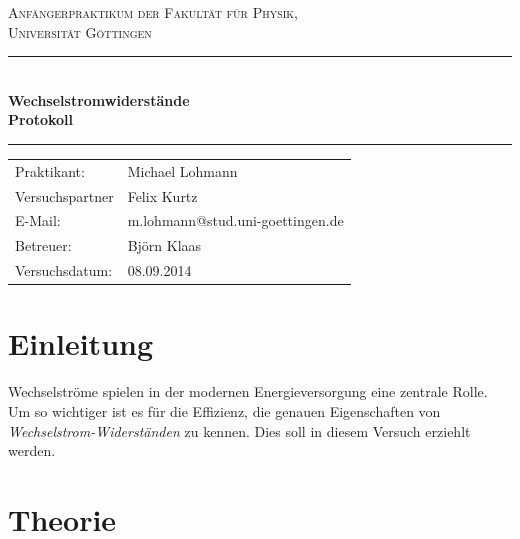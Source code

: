 \documentclass[12pt,a4paper,titlepage,headinclude,bibtotoc]{scrartcl}
\begin{document}
\begin{titlepage}
\centering
\textsc{\Large Anfängerpraktikum der Fakultät für
  Physik,\\[1.5ex] Universität Göttingen}

\vspace*{4.2cm}

\rule{\textwidth}{1pt}\\[0.5cm]
{\huge \bfseries
  Wechselstromwiderstände\\[1.5ex]
  Protokoll}\\[0.5cm]
\rule{\textwidth}{1pt}

\vspace*{2.5cm}

\begin{Large}
\begin{tabular}{ll}
Praktikant: &  Michael Lohmann\\
 Versuchspartner &  Felix Kurtz\\
 E-Mail: & m.lohmann@stud.uni-goettingen.de\\
 Betreuer: & Björn Klaas\\
 Versuchsdatum: & 08.09.2014\\
\end{tabular}
\end{Large}

\vspace*{0.8cm}

\begin{Large}
\end{Large}

\end{titlepage}

\tableofcontents

\newpage

\section{Einleitung}
\label{sec:einleitung}
Wechselströme spielen in der modernen Energieversorgung eine zentrale Rolle.
Um so wichtiger ist es für die Effizienz, die genauen Eigenschaften von \emph{Wechselstrom-Widerständen} zu kennen.
Dies soll in diesem Versuch erziehlt werden.
\section{Theorie}
\label{sec:theorie}
\end{document}

